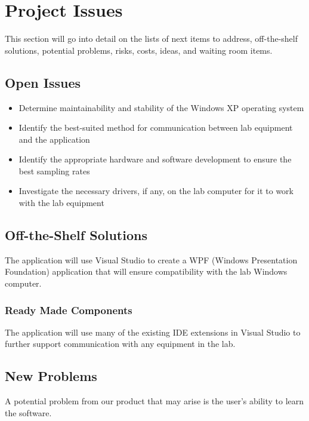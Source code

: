\documentclass[12pt, titlepage]{article}
\begin{document}
\section{Project Issues}
This section will go into detail on the lists of next items to address, off-the-shelf solutions, potential problems, risks, costs, ideas, and waiting room items.

\subsection{Open Issues}
\begin{itemize}
  \item Determine maintainability and stability of the Windows XP operating system
  \item Identify the best-suited method for communication between lab equipment and the application
  \item Identify the appropriate hardware and software development to ensure the best sampling rates
  \item Investigate the necessary drivers, if any, on the lab computer for it to work with the lab equipment
\end{itemize}

\subsection{Off-the-Shelf Solutions}
The application will use Visual Studio to create a WPF (Windows Presentation Foundation) application that will ensure compatibility with the lab Windows computer.


\subsubsection{Ready Made Components}

The application will use many of the existing IDE extensions in Visual Studio to further support communication with any equipment in the lab.

\subsection{New Problems}
 A potential problem from our product that may arise is the user's ability to learn the software.
\end{document}
